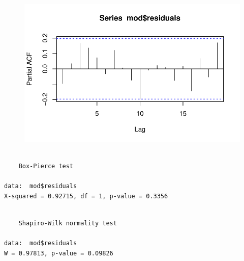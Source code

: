 \documentclass[
  letterpaper,
  DIV=11,
  numbers=noendperiod]{scrartcl}
\newenvironment{Shaded}{\begin{snugshade}}{\end{snugshade}}
\newcommand{\FunctionTok}[1]{\textcolor[rgb]{0.28,0.35,0.67}{#1}}
\newcommand{\NormalTok}[1]{\textcolor[rgb]{0.00,0.23,0.31}{#1}}
\newcommand{\SpecialCharTok}[1]{\textcolor[rgb]{0.37,0.37,0.37}{#1}}
\theoremstyle{plain}
\theoremstyle{plain}
\theoremstyle{definition}
\theoremstyle{definition}
\theoremstyle{remark}
\begin{document}
\begin{Shaded}
\end{Shaded}

\begin{figure}[H]

{\centering \includegraphics{processo_linear_geral_files/figure-pdf/unnamed-chunk-7-2.pdf}

}

\end{figure}

\begin{Shaded}
\end{Shaded}

\begin{verbatim}

    Box-Pierce test

data:  mod$residuals
X-squared = 0.92715, df = 1, p-value = 0.3356
\end{verbatim}

\begin{Shaded}
\end{Shaded}

\begin{verbatim}

    Shapiro-Wilk normality test

data:  mod$residuals
W = 0.97813, p-value = 0.09826
\end{verbatim}
\end{document}
